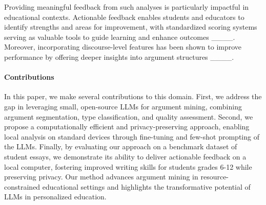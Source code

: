    Providing meaningful feedback from such analyses is particularly impactful in educational contexts. Actionable feedback enables students and educators to identify strengths and areas for improvement, with standardized scoring systems serving as valuable tools to guide learning and enhance outcomes ____. Moreover, incorporating discourse-level features has been shown to improve performance by offering deeper insights into argument structures  ____.

  \paragraph{Contributions} In this paper, we make several contributions to this domain. First, we address the gap in leveraging small, open-source LLMs for argument mining, combining argument segmentation, type classification, and quality assessment. Second, we propose a computationally efficient and privacy-preserving approach, enabling local analysis on standard devices through fine-tuning and few-shot prompting of the LLMs. Finally, by evaluating our approach on a benchmark dataset of student essays, we demonstrate its ability to deliver actionable feedback on a local computer, fostering improved writing skills for students grades 6-12 while preserving privacy. Our method advances argument mining in resource-constrained educational settings and highlights the transformative potential of LLMs in personalized education.
